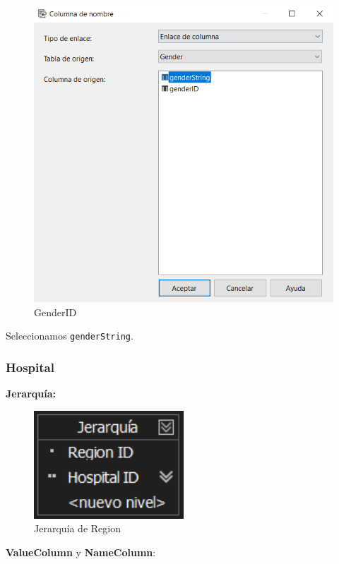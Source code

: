 \documentclass[12pt, a4paper, twoside]{article}
\begin{document}
\begin{figure}[H]
	\centering
	\includegraphics[width=1\textwidth]{image/GenderID}
	\caption{GenderID}
	\label{fig:14}
\end{figure}

Seleccionamos \texttt{genderString}.

\subsubsection{Hospital}

\textbf{Jerarquía:}

\begin{figure}[H]
	\centering
	\includegraphics[width=0.5\textwidth]{image/JRegion}
	\caption{Jerarquía de Region}
	\label{fig:15}
\end{figure}

\textbf{ValueColumn} y \textbf{NameColumn}:
\end{document}
